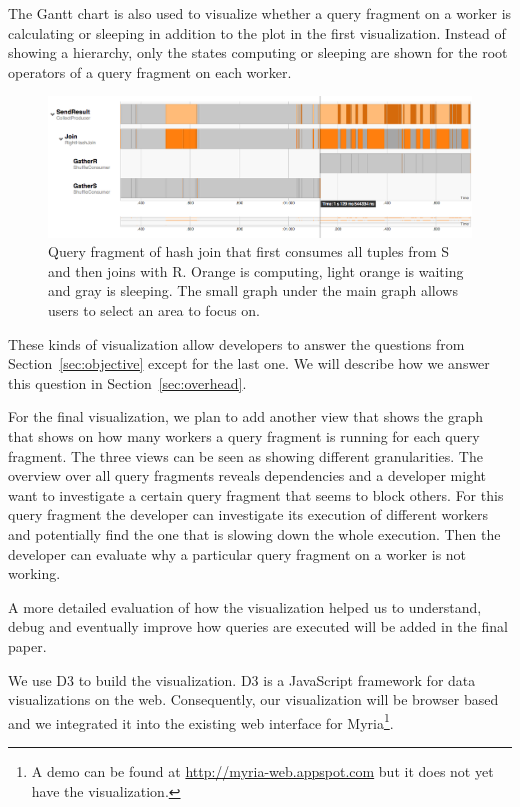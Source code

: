 \documentclass[11pt]{scrartcl}
\begin{document}
The Gantt chart is also used to visualize whether a query fragment on a worker is calculating or sleeping in addition to the plot in the first visualization. Instead of showing a hierarchy, only the states computing or sleeping are shown for the root operators of a query fragment on each worker.

\begin{figure}[h]
  \begin{center}
    \includegraphics[width=\textwidth]{join_gantt}
  \end{center}
  \caption{Query fragment of hash join that first consumes all tuples from S and then joins with R. Orange is computing, light orange is waiting and gray is sleeping. The small graph under the main graph allows users to select an area to focus on.}
  \label{fig:gantt}
\end{figure}

These kinds of visualization allow developers to answer the questions from Section~\ref{sec:objective} except for the last one. We will describe how we answer this question in Section~\ref{sec:overhead}.

For the final visualization, we plan to add another view that shows the graph that shows on how many workers a query fragment is running for each query fragment. The three views can be seen as showing different granularities. The overview over all query fragments reveals dependencies and a developer might want to investigate a certain query fragment that seems to block others. For this query fragment the developer can investigate its execution of different workers and potentially find the one that is slowing down the whole execution. Then the developer can evaluate why a particular query fragment on a worker is not working.

A more detailed evaluation of how the visualization helped us to understand, debug and eventually improve how queries are executed will be added in the final paper.

We use D3\cite{bostock2011d3} to build the visualization. D3 is a JavaScript framework for data visualizations on the web. Consequently, our visualization will be browser based and we integrated it into the existing web interface for Myria\footnote{A demo can be found at \url{http://myria-web.appspot.com} but it does not yet have the visualization.}.
\end{document}
